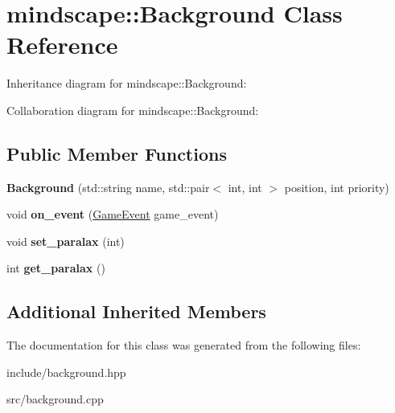 \hypertarget{classmindscape_1_1_background}{}\section{mindscape\+:\+:Background Class Reference}
\label{classmindscape_1_1_background}


Inheritance diagram for mindscape\+:\+:Background\+:


Collaboration diagram for mindscape\+:\+:Background\+:
\subsection*{Public Member Functions}
\begin{DoxyCompactItemize}
\item 
{\bfseries Background} (std\+::string name, std\+::pair$<$ int, int $>$ position, int priority)\hypertarget{classmindscape_1_1_background_a73e8e3561ad05c3228b67935376214dc}{}\label{classmindscape_1_1_background_a73e8e3561ad05c3228b67935376214dc}

\item 
void {\bfseries on\+\_\+event} (\hyperlink{class_game_event}{Game\+Event} game\+\_\+event)\hypertarget{classmindscape_1_1_background_af931f65e30c28af741c6e512138e6f50}{}\label{classmindscape_1_1_background_af931f65e30c28af741c6e512138e6f50}

\item 
void {\bfseries set\+\_\+paralax} (int)\hypertarget{classmindscape_1_1_background_aa60aa6d28e9a83b334c2be99a10fdcc2}{}\label{classmindscape_1_1_background_aa60aa6d28e9a83b334c2be99a10fdcc2}

\item 
int {\bfseries get\+\_\+paralax} ()\hypertarget{classmindscape_1_1_background_ada0efcfe6ebdb54789a414bd884e696f}{}\label{classmindscape_1_1_background_ada0efcfe6ebdb54789a414bd884e696f}

\end{DoxyCompactItemize}
\subsection*{Additional Inherited Members}


The documentation for this class was generated from the following files\+:\begin{DoxyCompactItemize}
\item 
include/background.\+hpp\item 
src/background.\+cpp\end{DoxyCompactItemize}
